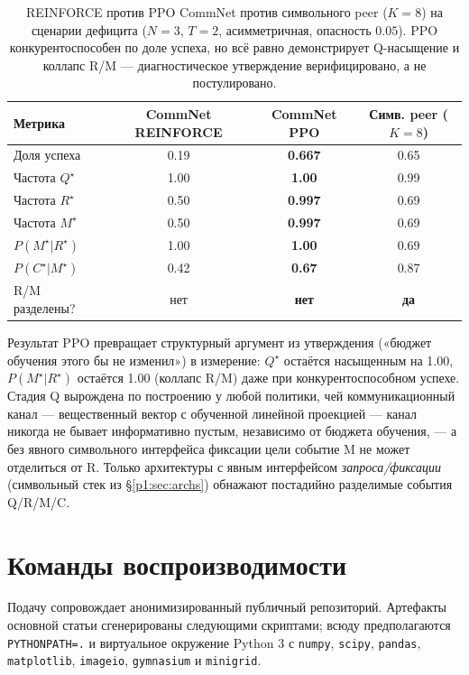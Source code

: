 \documentclass{article}
\begin{document}
\begin{table}[h]
\centering
\small
\caption{REINFORCE против PPO CommNet против символьного peer ($K{=}8$) на сценарии дефицита ($N{=}3$, $T{=}2$, асимметричная, опасность $0.05$). PPO конкурентоспособен по доле успеха, но всё равно демонстрирует Q-насыщение и коллапс R/M --- диагностическое утверждение верифицировано, а не постулировано.}
\label{p1:tab:ppo-commnet}
\begin{tabular}{l c c c}
\toprule
Метрика & CommNet REINFORCE & \textbf{CommNet PPO} & Симв. peer ($K{=}8$) \\
\midrule
Доля успеха                  & 0.19   & \textbf{0.667} & 0.65 \\
Частота $Q^\star$                & 1.00   & \textbf{1.00}  & 0.99 \\
Частота $R^\star$                & 0.50   & \textbf{0.997} & 0.69 \\
Частота $M^\star$                & 0.50   & \textbf{0.997} & 0.69 \\
$P(M^\star|R^\star)$          & 1.00   & \textbf{1.00}  & 0.69 \\
$P(C^\star|M^\star)$          & 0.42   & \textbf{0.67}  & 0.87 \\
R/M разделены?                & нет     & \textbf{нет}    & \textbf{да} \\
\bottomrule
\end{tabular}
\end{table}

Результат PPO превращает структурный аргумент из утверждения («бюджет обучения этого бы не изменил») в измерение: $Q^\star$ остаётся насыщенным на 1.00, $P(M^\star|R^\star)$ остаётся 1.00 (коллапс R/M) даже при конкурентоспособном успехе. Стадия Q вырождена по построению у любой политики, чей коммуникационный канал --- вещественный вектор с обученной линейной проекцией --- канал никогда не бывает информативно пустым, независимо от бюджета обучения, --- а без явного символьного интерфейса фиксации цели событие M не может отделиться от R. Только архитектуры с явным интерфейсом \emph{запроса/фиксации} (символьный стек из \S\ref{p1:sec:archs}) обнажают постадийно разделимые события Q/R/M/C.

\section{Команды воспроизводимости}
\label{p1:app:repro}

Подачу сопровождает анонимизированный публичный репозиторий. Артефакты основной статьи сгенерированы следующими скриптами; всюду предполагаются \texttt{PYTHONPATH=.} и виртуальное окружение Python 3 с \texttt{numpy}, \texttt{scipy}, \texttt{pandas}, \texttt{matplotlib}, \texttt{imageio}, \texttt{gymnasium} и \texttt{minigrid}.
\end{document}
